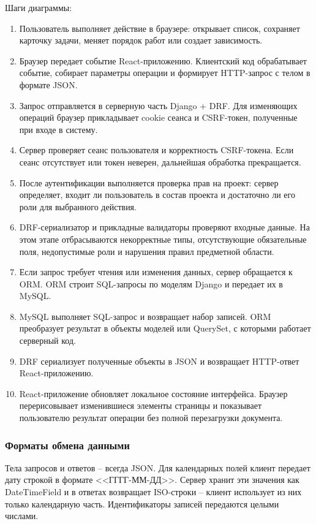 Шаги диаграммы:
\begin{enumerate}
    \item Пользователь выполняет действие в браузере: открывает список, сохраняет карточку задачи, меняет порядок работ или создает зависимость.
    \item Браузер передает событие React-приложению. Клиентский код обрабатывает событие, собирает параметры операции и формирует HTTP-запрос с телом в формате JSON.
    \item Запрос отправляется в серверную часть Django + DRF. Для изменяющих операций браузер прикладывает cookie сеанса и CSRF-токен, полученные при входе в систему.
    \item Сервер проверяет сеанс пользователя и корректность CSRF-токена. Если сеанс отсутствует или токен неверен, дальнейшая обработка прекращается.
    \item После аутентификации выполняется проверка прав на проект: сервер определяет, входит ли пользователь в состав проекта и достаточно ли его роли для выбранного действия.
    \item DRF-сериализатор и прикладные валидаторы проверяют входные данные. На этом этапе отбрасываются некорректные типы, отсутствующие обязательные поля, недопустимые роли и нарушения правил предметной области.
    \item Если запрос требует чтения или изменения данных, сервер обращается к ORM. ORM строит SQL-запросы по моделям Django и передает их в MySQL.
    \item MySQL выполняет SQL-запрос и возвращает набор записей. ORM преобразует результат в объекты моделей или QuerySet, с которыми работает серверный код.
    \item DRF сериализует полученные объекты в JSON и возвращает HTTP-ответ React-приложению.
    \item React-приложение обновляет локальное состояние интерфейса. Браузер перерисовывает изменившиеся элементы страницы и показывает пользователю результат операции без полной перезагрузки документа.
\end{enumerate}

\subsubsection{Форматы обмена данными}

Тела запросов и ответов -- всегда JSON. Для календарных полей клиент передает дату строкой в формате <<ГГГГ-ММ-ДД>>. Сервер хранит эти значения как DateTimeField и в ответах возвращает ISO-строки -- клиент использует из них только календарную часть. Идентификаторы записей передаются целыми числами.

